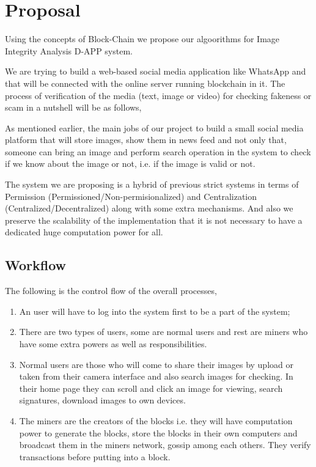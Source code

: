 \chapter{Proposal}
\label{ch:3}
\bigskip

Using the concepts of Block-Chain we propose our algoorithms for Image Integrity Analysis D-APP system.

We are trying to build a web-based social media application like WhatsApp and that will be connected with the online server running blockchain in it. The process of verification of the media (text, image or video) for checking fakeness or scam in a nutshell will be as follows,

As mentioned earlier, the main jobs of our project to build a small social media platform that will store images, show them in news feed and not only that, someone can bring an image and perform search operation in the system to check if we know about the image or not, i.e. if the image is valid or not.

The system we are proposing is a hybrid of previous strict systems in terms of Permission (Permissioned/Non-permisionalized) and Centralization (Centralized/Decentralized) along with some extra mechanisms. And also we preserve the scalability of the implementation that it is not necessary to have a dedicated huge computation power for all.

\section{Workflow}
The following is the control flow of the overall processes,
\begin{enumerate}
\item An user will have to log into the system first to be a part of the system;
\item There are two types of users, some are normal users and rest are miners who have some extra powers as well as responsibilities.
\item Normal users are those who will come to share their images by upload or taken from their camera interface and also search images for checking. In their home page they can scroll and click an image for viewing, search signatures, download images to own devices.
\item The miners are the creators of the blocks i.e. they will have computation power to generate the blocks, store the blocks in their own computers and broadcast them in the miners network, gossip among each others. They verify transactions before putting into a block.
\end{enumerate}

